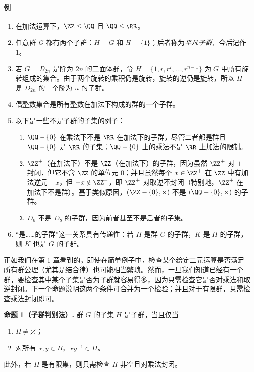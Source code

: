 \paragraph{例}
\begin{enumerate}[label=(\arabic*)]
  \item 在加法运算下，$\ZZ\leq \QQ$ 且 $\QQ\leq \RR$。
  \item 任意群 $G$ 都有两个子群：$H=G$ 和 $H=\{1\}$；后者称为\emph{平凡子群}，今后记作 $1$。
  \item 若 $G=D_{2n}$ 是阶为 $2n$ 的二面体群，令 $H=\{1,r,r^2,\ldots,r^{n-1}\}$ 为 $G$ 中所有旋转组成的集合。由于两个旋转的乘积仍是旋转，旋转的逆仍是旋转，所以 $H$ 是 $D_{2n}$ 的一个阶为 $n$ 的子群。
  \item 偶整数集合是所有整数在加法下构成的群的一个子群。
  \item 以下是一些不是子群的子集的例子：
  \begin{enumerate}[label=(\alph*)]
    \item $\QQ-\{0\}$ 在乘法下不是 $\RR$ 在加法下的子群，尽管二者都是群且 $\QQ-\{0\}$ 是 $\RR$ 的子集；$\QQ-\{0\}$ 上的乘法不是 $\RR$ 上加法的限制。
    \item $\ZZ^+$（在加法下）不是 $\ZZ$（在加法下）的子群，因为虽然 $\ZZ^+$ 对 $+$ 封闭，但它不含 $\ZZ$ 的单位元 $0$；并且虽然每个 $x\in\ZZ^+$ 在 $\ZZ$ 中有加法逆元 $-x$，但 $-x\notin\ZZ^+$，即 $\ZZ^+$ 对取逆不封闭（特别地，$\ZZ^+$ 在加法下不是群）。基于类似原因，$(\ZZ-\{0\},\times)$ 不是 $(\QQ-\{0\},\times)$ 的子群。
    \item $D_6$ 不是 $D_8$ 的子群，因为前者甚至不是后者的子集。
  \end{enumerate}
  \item “是……的子群”这一关系具有传递性：若 $H$ 是群 $G$ 的子群，$K$ 是 $H$ 的子群，则 $K$ 也是 $G$ 的子群。
\end{enumerate}

正如我们在第 1 章看到的，即使在简单例子中，检查某个给定二元运算是否满足所有群公理（尤其是结合律）也可能相当繁琐。然而，一旦我们知道已经有一个群，要检查其中某个子集是否为子群就容易得多，因为只需检查它是否对乘法和取逆封闭。下一个命题说明这两个条件可合并为一个检验；并且对于有限群，只需检查乘法封闭即可。

\medskip
\noindent\textbf{命题 1（子群判别法）.} 群 $G$ 的子集 $H$ 是子群，当且仅当
\begin{enumerate}[label=(\arabic*)]
  \item $H\neq\varnothing$；
  \item 对所有 $x,y\in H$，$xy^{-1}\in H$。
\end{enumerate}
此外，若 $H$ 是有限集，则只需检查 $H$ 非空且对乘法封闭。

